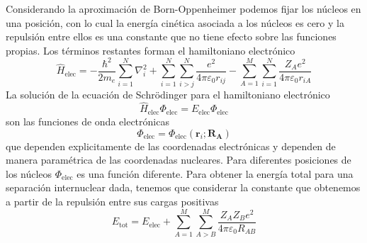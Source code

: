 Considerando la aproximación de Born-Oppenheimer podemos fijar
los núcleos en una posición, con lo cual la energía cinética 
asociada a los núcleos es cero y la repulsión entre ellos es
una constante que no tiene efecto sobre las funciones propias. 
Los términos restantes forman el hamiltoniano electrónico
\begin{equation}
    \hat{H}_\mathrm{elec}= -\frac{\hbar^2}{2m_e}\sum_{i=1}^N\nabla^2_i 
    +\sum_{i=1}^N\sum_{i>j}^N \frac{e^2}{4\pi\varepsilon_0r_{ij}}
    -\sum_{A=1}^M\sum_{i=1}^{N}\frac{Z_Ae^2}{4\pi\varepsilon_0r_{iA}} 
\end{equation}
La solución de la ecuación de Schrödinger para el hamiltoniano
electrónico 
\begin{equation}
\hat{H}_\mathrm{elec}\Phi_\mathrm{elec} = E_\mathrm{elec}\Phi_\mathrm{elec}
\end{equation}
son las funciones de onda electrónicas
\begin{equation}
    \Phi_\mathrm{elec}=\Phi_\mathrm{elec}({\mathbf{r}_i}; {\mathbf{R_A}})
\end{equation}
que dependen explicitamente de las coordenadas electrónicas y
dependen de manera paramétrica de las coordenadas nucleares.
Para diferentes posiciones de los núcleos $\Phi_\mathrm{elec}$
es una función diferente. Para obtener la energía total para
una separación internuclear dada, tenemos que considerar
la constante que obtenemos a partir de la repulsión entre sus
cargas positivas
\begin{equation}
    E_\mathrm{tot}= E_\mathrm{elec} + \sum_{A=1}^M\sum_{A>B}^M\frac{Z_AZ_Be^2}{4\pi\varepsilon_0R_{AB}}
\end{equation}

